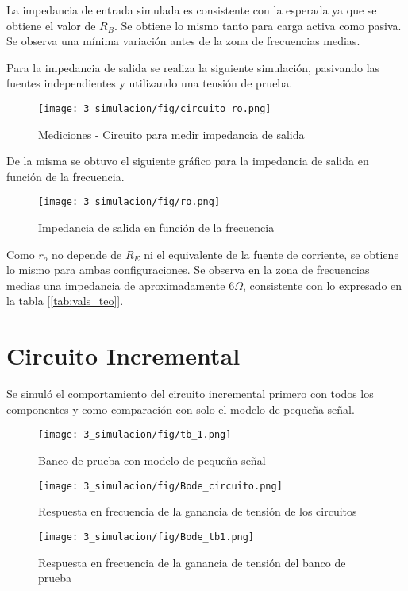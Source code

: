 La impedancia de entrada simulada es consistente con la esperada ya que se obtiene el valor de $R_B$. Se obtiene lo mismo 
tanto para carga activa como pasiva. Se observa una mínima variación antes de la zona de frecuencias medias. \par 


Para la impedancia de salida se realiza la siguiente simulación, pasivando las fuentes independientes 
y utilizando una tensión de prueba.

\begin{figure}[H]
    \centering
    \texttt{[image: 3\_simulacion/fig/circuito\_ro.png]}
    \label{mediciones_pol_activa}
    \caption{Mediciones - Circuito para medir impedancia de salida}
\end{figure}

De la misma se obtuvo el siguiente gráfico para la impedancia de salida en función de la frecuencia.

\begin{figure}[H]
    \centering
    \texttt{[image: 3\_simulacion/fig/ro.png]}
    \label{mediciones_pol_activa}
    \caption{Impedancia de salida en función de la frecuencia}
\end{figure}
Como $r_o$ no depende de $R_E$ ni el equivalente de la fuente de corriente, se obtiene lo mismo para ambas 
configuraciones. Se observa en la zona de frecuencias medias una impedancia de aproximadamente $6 \Omega$, 
consistente con lo expresado en la tabla [\ref{tab:vals_teo}].



\newpage
\section{Circuito Incremental}
Se simuló el comportamiento del circuito incremental primero con todos los componentes y como comparación con solo el modelo de pequeña señal.

\begin{figure}[ht]
    \centering
    \texttt{[image: 3\_simulacion/fig/tb\_1.png]}
    \caption{Banco de prueba con modelo de pequeña señal}
\end{figure}

\begin{figure}[ht]
    \begin{minipage}[t]{0.48\textwidth}
        \centering
        \texttt{[image: 3\_simulacion/fig/Bode\_circuito.png]}
        \caption{Respuesta en frecuencia de la ganancia de tensión de los circuitos}
        \label{fig:bode_cir}
    \end{minipage}\hfill
    \begin{minipage}[t]{0.48\textwidth}
        \centering
        \texttt{[image: 3\_simulacion/fig/Bode\_tb1.png]}
        \caption{Respuesta en frecuencia de la ganancia de tensión del banco de prueba}
        \label{fig:bode_tb1}
    \end{minipage}
\end{figure}

